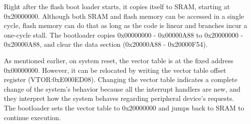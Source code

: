 Right after the flash boot loader starts, it copies itself to SRAM, starting at 0x20000000. Although both SRAM and flash memory can be accessed in a single cycle, flash memory can do that as long as the code is linear and branches incur a one-cycle stall. The bootloader copies 0x00000000 - 0x00000A88 to 0x20000000 - 0x20000A88, and clear the data section (0x20000A88 - 0x20000F54). 

As mentioned earlier, on system reset, the vector table is at the fixed address 0x00000000. However, it can be relocated by writing the vector table offset register (VTOR:0xE000ED08). Changing the vector table indicates a complete change of the system's behavior because all the interrupt handlers are new, and they interpret how the system behaves regarding peripheral device's requests. The bootloader sets the vector table to 0x20000000 and jumps back to SRAM to continue execution.


